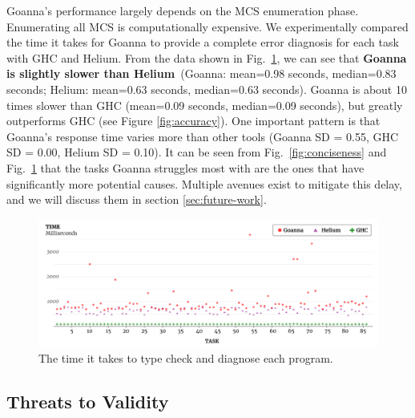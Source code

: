     Goanna's performance largely depends on the MCS enumeration phase. Enumerating all MCS is computationally expensive. We experimentally compared the time it takes for Goanna to provide a complete error diagnosis for each task with GHC and Helium. From the data shown in Fig.~\ref{fig:performance}, we can see that \textbf{Goanna is slightly slower than Helium}~(Goanna: mean=0.98 seconds, median=0.83 seconds; Helium: mean=0.63 seconds, median=0.63 seconds). Goanna is about 10 times slower than GHC (mean=0.09 seconds, median=0.09 seconds), but greatly outperforms GHC (see Figure \ref{fig:accuracy}). One important pattern is that Goanna's response time varies more than other tools (Goanna SD = 0.55, GHC SD = 0.00, Helium SD = 0.10). It can be seen from Fig.~\ref{fig:conciseness} and Fig.~\ref{fig:performance} that the tasks Goanna struggles most with are the ones that have significantly more potential causes. Multiple avenues exist to mitigate this delay, and we will discuss them in section \ref{sec:future-work}.
    
    \begin{figure}[ht!]
        \centering
        \includegraphics[width=\linewidth]{images/Performance}
        \caption{The time it takes to type check and diagnose each program.}
        \label{fig:performance}
    \end{figure}

	
	



    \subsection{Threats to Validity}

